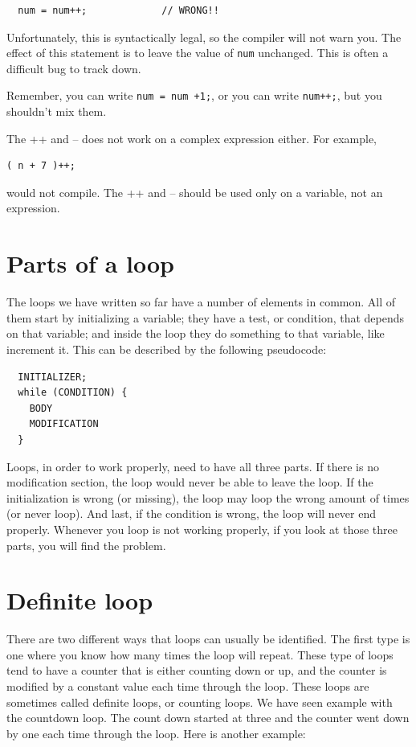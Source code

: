 \begin{verbatim}
  num = num++;             // WRONG!!
\end{verbatim}
%
Unfortunately, this is syntactically legal, so the compiler
will not warn you.  The effect of this statement is to leave
the value of {\tt num} unchanged.  This is often a difficult
bug to track down.

Remember, you can write {\tt num = num +1;}, or you
can write {\tt num++;}, but you shouldn't mix them.

The ++ and -- does not work on a complex expression either. For example, 

\begin {verbatim}
( n + 7 )++;
\end{verbatim}
would not compile. The ++ and -- should be used only on a variable, not an expression.

\section{Parts of a loop}
The loops we have written so far have a number of elements
in common.  All of them start by initializing a variable;
they have a test, or condition, that depends on that variable;
and inside the loop they do something to that variable,
like increment it. This can be described by the following pseudocode:
\begin{verbatim}
  INITIALIZER;
  while (CONDITION) {
    BODY
    MODIFICATION
  }
\end{verbatim}
Loops, in order to work properly, need to have all three parts. If there is no modification section, the loop would never be able to leave the loop. If the initialization is wrong (or missing), the loop may loop the wrong amount of times (or never loop). And last, if the condition is wrong, the loop will never end properly. Whenever you loop is not working properly, if you look at those three parts, you will find the problem.

\section{Definite loop}
There are two different ways that loops can usually be identified. The first type 
is one where you know how many times the loop will repeat. These type of loops tend to
have a counter that is either counting down or up, and the counter is modified by a
constant value each time through the loop. These loops are sometimes called definite loops,
or counting loops. We have seen example with the countdown loop. The count down started at
three and the counter went down by one each time through the loop. Here is another example:

